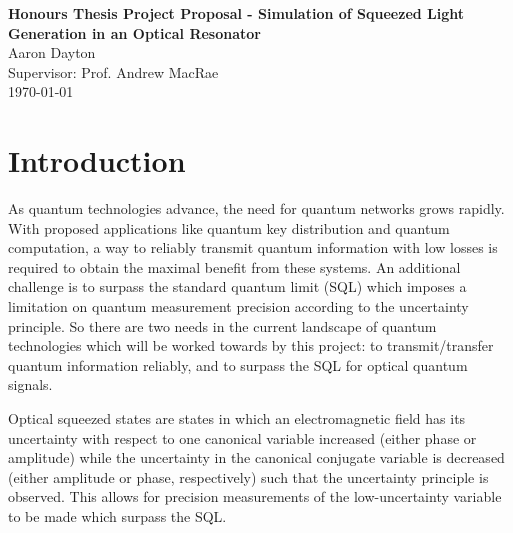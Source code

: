 \documentclass[aps,pra,showpacs,amsmath,amssymb,nofootinbib,longbibliography,superscriptaddress
]{revtex4-1}
\theoremstyle{definition}
\theoremstyle{remark}
\newcommand{\0}{\hat{0}}
\begin{document}



\begin{center}
    \textbf{\Large Honours Thesis Project Proposal - Simulation of Squeezed Light Generation in an Optical Resonator} \\ %
    \vspace{0.5cm} %
    \Large Aaron Dayton \\ %
    \vspace{0.3cm} %
    \Large Supervisor: Prof. Andrew MacRae \\ %
    \vspace{0.3cm} %
    \today \\ %
\end{center}


\section{Introduction}

As quantum technologies advance, the need for quantum networks grows rapidly. With proposed applications like quantum key distribution and quantum computation, a way to reliably transmit quantum information with low losses is required to obtain the maximal benefit from these systems. An additional challenge is to surpass the standard quantum limit (SQL) which imposes a limitation on quantum measurement precision according to the uncertainty principle. So there are two needs in the current landscape of quantum technologies which will be worked towards by this project: to transmit/transfer quantum information reliably, and to surpass the SQL for optical quantum signals.


Optical squeezed states are states in which an electromagnetic field has its uncertainty with respect to one canonical variable increased (either phase or amplitude) while the uncertainty in the canonical conjugate variable is decreased (either amplitude or phase, respectively) such that the uncertainty principle is observed. This allows for precision measurements of the low-uncertainty variable to be made which surpass the SQL.
\end{document}
